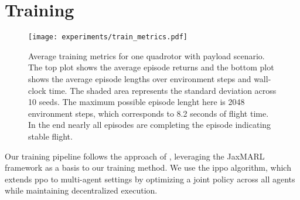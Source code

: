 


\section{Training}
\begin{figure}[ht]
    \centering
    
    \texttt{[image: experiments/train\_metrics.pdf]}
    \caption[Training metrics]{Average training metrics for one quadrotor with payload scenario. The top plot shows the average episode returns and the bottom plot shows the average episode lengths over environment steps and wall-clock time. The shaded area represents the standard deviation across 10 seeds. The maximum possible episode lenght here is 2048 environment steps, which corresponds to 8.2 seconds of flight time. In the end nearly all episodes are completing the episode indicating stable flight.}
    \label{fig:train_metrics}
\end{figure}
Our training pipeline follows the approach of \autocite{flair2023jaxmarl}, leveraging the JaxMARL framework as a basis to our training method. We use the \gls{ippo} algorithm, which extends \gls{ppo} to multi-agent settings by optimizing a joint policy across all agents while maintaining decentralized execution.

